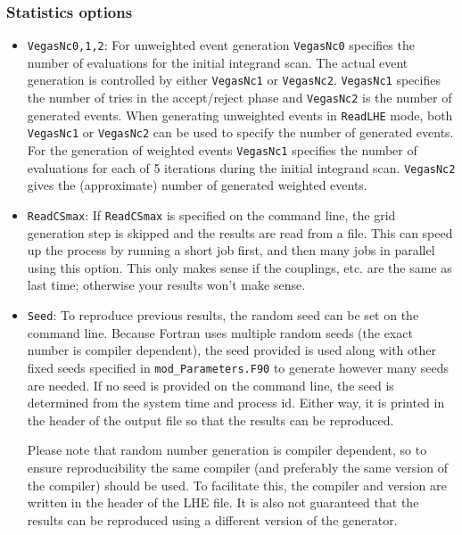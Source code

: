 \documentclass[aps,superscriptaddress,nofootinbib]{revtex4}
\begin{document}
\begin{itemize}
\subsubsection{Statistics options}
\begin{itemize}
\item \verb|VegasNc0,1,2|: For unweighted event generation \verb|VegasNc0| specifies the number of evaluations for the initial integrand scan.  The actual event generation is controlled by either \verb|VegasNc1| or \verb|VegasNc2|. \verb|VegasNc1| specifies the number of tries in the accept/reject phase and \verb|VegasNc2| is the number of generated events. When generating unweighted events in \verb|ReadLHE| mode, both \verb|VegasNc1| or \verb|VegasNc2| can be used to specify the number of generated events. For the generation of weighted events \verb|VegasNc1| specifies the number of evaluations for each of 5 iterations during the initial integrand scan. \verb|VegasNc2| gives the (approximate) number of generated weighted events.
\item \verb|ReadCSmax|: If \verb|ReadCSmax| is specified on the command line, the grid generation step is skipped and the results are read from a file.  This can speed up the process by running a short job first, and then many jobs in parallel using this option.  This only makes sense if the couplings, etc. are the same as last time; otherwise your results won't make sense.
\item \verb|Seed|: To reproduce previous results, the random seed can be set on the command line.  Because Fortran uses multiple random seeds (the exact number is compiler dependent), the seed provided is used along with other fixed seeds specified in \verb|mod_Parameters.F90| to generate however many seeds are needed.  If no seed is provided on the command line, the seed is determined from the system time and process id.  Either way, it is printed in the header of the output file so that the results can be reproduced.

Please note that random number generation is compiler dependent, so to ensure reproducibility the same compiler (and preferably the same version of the compiler) should be used.  To facilitate this, the compiler and version are written in the header of the LHE file.  It is also not guaranteed that the results can be reproduced using a different version of the generator.
\end{itemize}


\end{itemize}
\end{document}
